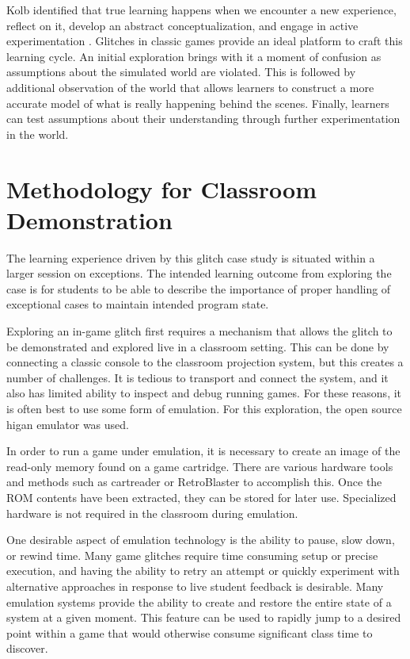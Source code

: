 \documentclass[letterpaper]{article}
\begin{document}
Kolb identified that true learning happens when we encounter a new experience, reflect on it, develop an abstract conceptualization, and engage in active experimentation \cite{kolb84}. Glitches in classic games provide an ideal platform to craft this learning cycle. An initial exploration brings with it a moment of confusion as assumptions about the simulated world are violated. This is followed by additional observation of the world that allows learners to construct a more accurate model of what is really happening behind the scenes. Finally, learners can test assumptions about their understanding through further experimentation in the world.

\section{Methodology for Classroom Demonstration}

The learning experience driven by this glitch case study is situated within a larger session on exceptions. The intended learning outcome from exploring the case is for students to be able to describe the importance of proper handling of exceptional cases to maintain intended program state.

Exploring an in-game glitch first requires a mechanism that allows the glitch to be demonstrated and explored live in a classroom setting. This can be done by connecting a classic console to the classroom projection system, but this creates a number of challenges. It is tedious to transport and connect the system, and it also has limited ability to inspect and debug running games. For these reasons, it is often best to use some form of emulation. For this exploration, the open source higan\cite{ginder2004higan}  emulator was used.

In order to run a game under emulation, it is necessary to create an image of the read-only memory found on a game cartridge. There are various hardware tools and methods such as cartreader\cite{sanni_cartreader} or RetroBlaster\cite{retroblaster} to accomplish this. Once the ROM contents have been extracted, they can be stored for later use. Specialized hardware is not required in the classroom during emulation.

One desirable aspect of emulation technology is the ability to pause, slow down, or rewind time. Many game glitches require time consuming setup or precise execution, and having the ability to retry an attempt or quickly experiment with alternative approaches in response to live student feedback is desirable. Many emulation systems provide the ability to create and restore the entire state of a system at a given moment. This feature can be used to rapidly jump to a desired point within a game that would otherwise consume significant class time to discover.
\end{document}
